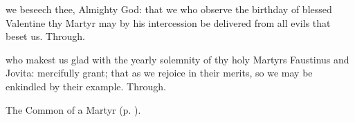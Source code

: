 

\memorialCollect
{} we beseech thee, Almighty God: that we who observe the birthday of blessed Valentine thy Martyr may by his intercession be delivered from all evils that beset us. Through.




\memorialCollect
{} who makest us glad with the yearly solemnity of thy holy Martyrs Faustinus and Jovita: mercifully grant; that as we rejoice in their merits, so we may be enkindled by their example. Through.



\begin{rubric}
	The Common of a Martyr (p. \pageref{CommonMartyrBishopCollect}).
\end{rubric}


\clearpage
{}\label{CathedraAntioch}


